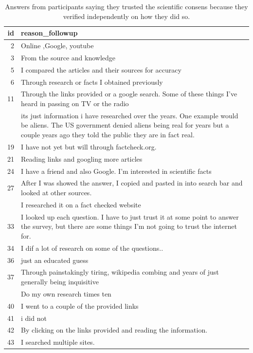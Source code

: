 \documentclass[
  doc,floatsintext]{apa6}
\begin{document}
\begin{longtable}[t]{>{}r>{\raggedright\arraybackslash}p{30em}}
\caption{\label{tab:exp4-independent-verification}Answers from participants saying they trusted the scientific consens because they verified independently on how they did so.}\\
\toprule
id & reason\_followup\\
\midrule
2 & Online ,Google, youtube\\
3 & From the source and knowledge\\
5 & I compared the articles and their sources for accuracy\\
6 & Through research or facts I obtained previously\\
11 & Through the links provided or a google search. Some of these things I've heard in passing on TV or the radio\\
\addlinespace
17 & its just information i have researched over the years. One example would be aliens. The US government denied aliens being real for years but a couple years ago they told the public they are in fact real.\\
19 & I have not yet but will through factcheck.org.\\
21 & Reading links and googling more articles\\
24 & I have a friend and also Google.  I'm interested in scientific facts\\
27 & After I was showed the answer, I copied and pasted in into search bar and looked at other sources.\\
\addlinespace
31 & I researched it on a fact checked website\\
33 & I looked up each question. I have to just trust it at some point to answer the survey, but there are some things I'm not going to trust the internet for.\\
34 & I dif a lot of research on some of the questions..\\
36 & just an educated guess\\
37 & Through painstakingly tiring, wikipedia combing and years of just generally being inquisitive\\
\addlinespace
38 & Do my own research times ten\\
40 & I went to a couple of the provided links\\
41 & i did not\\
42 & By clicking on the links provided and reading the information.\\
43 & I searched multiple sites.\\

\end{longtable}
\end{document}
